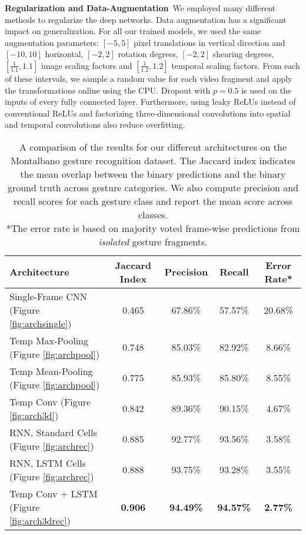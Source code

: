 \documentclass[11pt,a4paper]{article} \usepackage{a4wide}
\begin{document}
\textbf{Regularization and Data-Augmentation}\, We employed many different methods to regularize the deep networks. Data augmentation has a significant impact on generalization. For all our trained models, we used the same augmentation parameters: $[-5,5]$ pixel translations in vertical direction and $[-10,10]$ horizontal, $[-2,2]$ rotation degrees, $[-2,2]$ shearing degrees, $[\frac{1}{1.1},1.1]$ image scaling factors and $[\frac{1}{1.2},1.2]$ temporal scaling factors. From each of these intervals, we sample a random value for each video fragment and apply the transformations online using the CPU. Dropout with $p=0.5$ is used on the inputs of every fully connected layer. Furthermore, using leaky ReLUs instead of conventional ReLUs and factorizing three-dimensional convolutions into spatial and temporal convolutions also reduce overfitting.




















\begin{table}[t]
\centering
\begin{tabular}{lcccc}
\toprule
\multicolumn{1}{l}{\bf Architecture}  &\multicolumn{1}{c}{\bf Jaccard Index}  &\multicolumn{1}{c}{\bf Precision} &\multicolumn{1}{c}{\bf Recall} &\multicolumn{1}{c}{\bf Error Rate*}\\
\midrule

Single-Frame CNN (Figure \ref{fig:archsingle})					&0.465 &67.86\% &57.57\% &20.68\%\\
Temp Max-Pooling (Figure \ref{fig:archpool})					&0.748 &85.03\% &82.92\% &8.66\%\\
Temp Mean-Pooling (Figure \ref{fig:archpool})					&0.775 &85.93\% &85.80\% &8.55\%\\
Temp Conv (Figure \ref{fig:arch3d})							&0.842 &89.36\% &90.15\% &4.67\%\\
RNN, Standard Cells (Figure \ref{fig:archrec})				&0.885 &92.77\% &93.56\% &3.58\%\\
RNN, LSTM Cells (Figure \ref{fig:archrec})					&0.888 &93.75\% &93.28\% &3.55\%\\
Temp Conv + LSTM (Figure \ref{fig:arch3drec})					&\textbf{0.906} &\textbf{94.49\%} &\textbf{94.57\%} &\textbf{2.77\%}\\
\bottomrule
\end{tabular}
\caption{A comparison of the results for our different architectures on the Montalbano gesture recognition dataset. The Jaccard index indicates the mean overlap between the binary predictions and the binary ground truth across gesture categories. We also compute precision and recall scores for each gesture class and report the mean score across classes. \\ *The error rate is based on majority voted frame-wise predictions from \emph{isolated} gesture fragments. }
\label{tab:results}
\end{table}
\end{document}
